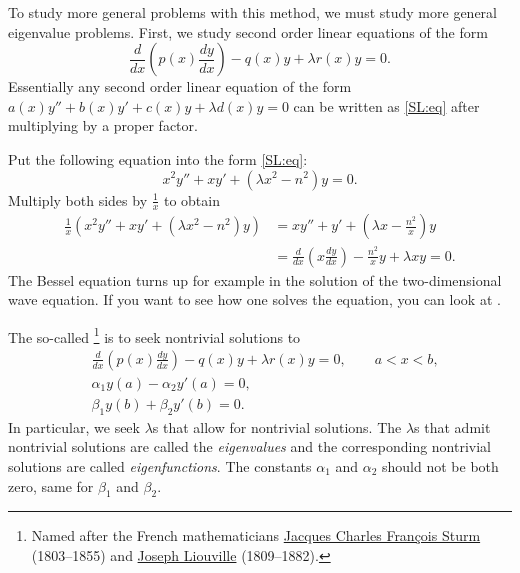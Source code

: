\documentclass{ximera}
\begin{document}
To study more general problems with this method, we must study more general eigenvalue problems. First, we study second order linear equations of the form
\begin{equation} \label{SL:eq}
    \frac{d}{dx} \left( p(x) \frac{dy}{dx} \right) - q(x) y + \lambda r(x) y = 0 .
\end{equation}
Essentially any second order linear equation of the form $a(x) y'' + b(x) y' + c(x) y + \lambda d(x) y = 0$ can be written as \eqref{SL:eq} after multiplying by a proper factor.

\begin{example}%
    Put the following equation into the form \eqref{SL:eq}:
    \begin{equation*}
        x^2 y'' + xy' + \left(\lambda x^2 - n^2\right)y = 0 .
    \end{equation*}
    Multiply both sides by $\frac{1}{x}$ to obtain
    \begin{equation*}
        \begin{split}
            \frac{1}{x} \left( x^2 y'' + xy' + \left(\lambda x^2 - n^2\right)y \right)
            & = x y'' + y' + \left(\lambda x - \frac{n^2}{x}\right)y  \\
            & =\frac{d}{dx} \left( x \frac{dy}{dx} \right)- \frac{n^2}{x} y + \lambda x y  = 0.
        \end{split}
    \end{equation*}
    The Bessel equation turns up for example in the solution of the two-dimensional wave equation. If you want to see how one solves the equation, you can look at .
\end{example}

The so-called \emph{}%
\footnote{
    Named after the French mathematicians \href{https://en.wikipedia.org/wiki/Jacques_Charles_Fran\%C3\%A7ois_Sturm}{Jacques Charles Fran\c{c}ois Sturm} (1803--1855) and \href{https://en.wikipedia.org/wiki/Liouville}{Joseph Liouville} (1809--1882).
    } 
is to seek nontrivial solutions to
\begin{equation} \label{sl:slprob}
    \begin{aligned}
        &\frac{d}{dx} \left( p(x) \frac{dy}{dx} \right) - q(x) y + \lambda r(x) y = 0, \qquad a < x < b, \\
        &\alpha_1 y(a) - \alpha_2 y'(a) = 0, \\
        &\beta_1 y(b) + \beta_2 y'(b) = 0.
    \end{aligned}
\end{equation}
In particular, we seek $\lambda$s that allow for nontrivial solutions. The $\lambda$s that admit nontrivial solutions are called the \emph{eigenvalues} and the corresponding nontrivial solutions are called \emph{eigenfunctions}. The constants $\alpha_1$ and $\alpha_2$ should not be both zero, same for $\beta_1$ and $\beta_2$.
\end{document}
